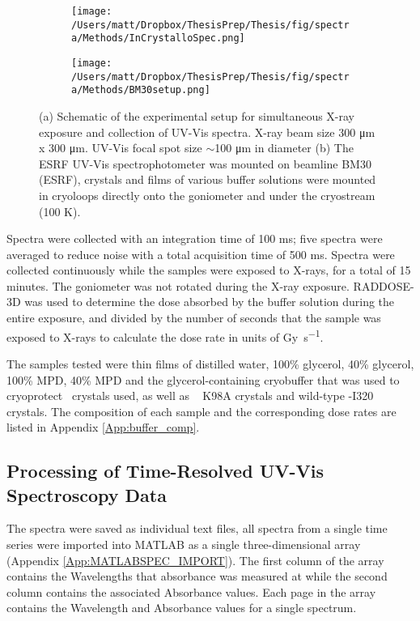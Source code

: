 \begin{figure}[!htbp]
\centering
\begin{subfigure}{.5\textwidth}
  \centering
  \texttt{[image: /Users/matt/Dropbox/ThesisPrep/Thesis/fig/spectra/Methods/InCrystalloSpec.png]}
  \caption{}
  \label{fig:InCrystalloSchematic}
\end{subfigure}%
\begin{subfigure}{.5\textwidth}
  \centering
  \texttt{[image: /Users/matt/Dropbox/ThesisPrep/Thesis/fig/spectra/Methods/BM30setup.png]}
  \caption{}
  \label{fig:BM30spec}
\end{subfigure}
\caption[Experimental Setup for Collection of Online UV-Vis Spectra]{(a) Schematic of the experimental setup for simultaneous X-ray exposure and collection of UV-Vis spectra. X-ray beam size 300 \si{\micro\meter} x 300 \si{\micro\meter}. UV-Vis focal spot size $\sim$100 \si{\micro\meter} in diameter (b) The ESRF UV-Vis spectrophotometer was mounted on beamline BM30 (ESRF), crystals and films of various buffer solutions were mounted in cryoloops directly onto the goniometer and under the cryostream (100 K).}
\end{figure}


Spectra were collected with an integration time of 100 \si{\milli\second}; five spectra were averaged to reduce noise with a total acquisition time of 500 \si{\milli\second}. Spectra were collected continuously while the samples were exposed to X-rays, for a total of 15 minutes. The goniometer was not rotated during the X-ray exposure. RADDOSE-3D was used to determine the dose absorbed by the buffer solution during the entire exposure, and divided by the number of seconds that the sample was exposed to X-rays to calculate the dose rate in units of \si{\gray\per\second}.

The samples tested were thin films of distilled water, 100\% glycerol, 40\% glycerol, 100\% MPD, 40\% MPD and the glycerol-containing cryobuffer that was used to cryoprotect \atpdx ~crystals used, as well as \atpdx ~ K98A crystals and wild-type \atpdx -I320 crystals. The composition of each sample and the corresponding dose rates are listed in Appendix \ref{App:buffer_comp}.

      
\clearpage
\subsection{Processing of Time-Resolved UV-Vis Spectroscopy Data}\label{sec:SPEC_PROC}
The spectra were saved as individual text files, all spectra from a single time series were imported into MATLAB as a single three-dimensional array (Appendix \ref{App:MATLABSPEC_IMPORT}). The first column of the array contains the Wavelengths that absorbance was measured at while the second column contains the associated Absorbance values. Each page in the array contains the Wavelength and Absorbance values for a single spectrum. 

